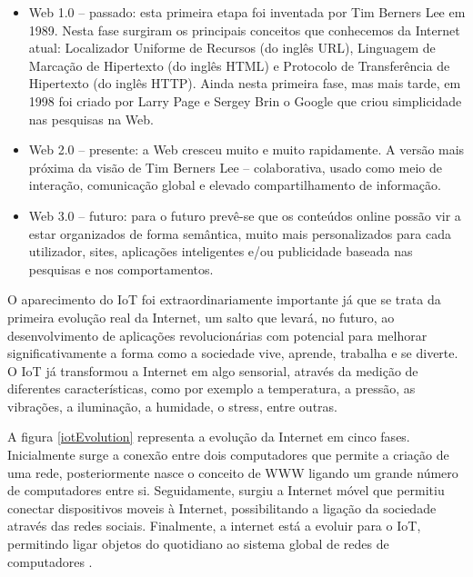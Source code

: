 \begin{itemize}
	\item Web 1.0 – passado: esta primeira etapa foi inventada por Tim Berners Lee em 1989\cite{Getting}. Nesta fase surgiram os principais conceitos que conhecemos da Internet atual: Localizador Uniforme de Recursos (do inglês \ac{URL}), Linguagem de Marcação de Hipertexto (do inglês \ac{HTML}) e Protocolo de Transferência de Hipertexto (do inglês \ac{HTTP}). Ainda nesta primeira fase, mas mais tarde, em 1998 foi criado por Larry Page e Sergey Brin o Google que criou simplicidade nas pesquisas na Web\cite{Lovato2014}. 
	
	\item Web 2.0 – presente: a Web cresceu muito e muito rapidamente. A versão mais próxima da visão de Tim Berners Lee – colaborativa, usado como meio de interação, comunicação global e elevado compartilhamento de informação. 
	
	\item Web 3.0 – futuro: para o futuro prevê-se que os conteúdos online possão vir a estar organizados de forma semântica, muito mais personalizados para cada utilizador, sites, aplicações inteligentes e/ou publicidade baseada nas pesquisas e nos comportamentos.
\end{itemize}

O aparecimento do IoT foi extraordinariamente importante já que se trata da primeira evolução real da Internet, um salto que levará, no futuro, ao desenvolvimento de aplicações revolucionárias com potencial para melhorar significativamente a forma como a sociedade vive, aprende, trabalha e se diverte. O IoT já transformou a Internet em algo sensorial, através da medição de diferentes características, como por exemplo a temperatura, a pressão, as vibrações, a iluminação, a humidade, o stress, entre outras. 

A figura \ref{iotEvolution} representa a evolução da Internet em cinco fases. Inicialmente surge a conexão entre dois computadores que permite a criação de uma rede, posteriormente nasce o conceito de \ac{WWW} ligando um grande número de computadores entre si. Seguidamente, surgiu a Internet móvel que permitiu conectar dispositivos moveis à Internet, possibilitando a ligação da sociedade através das redes sociais.
Finalmente, a internet está a evoluir para o \ac{IoT}, permitindo ligar objetos do quotidiano ao sistema global de redes de computadores \cite{Our2013}.






